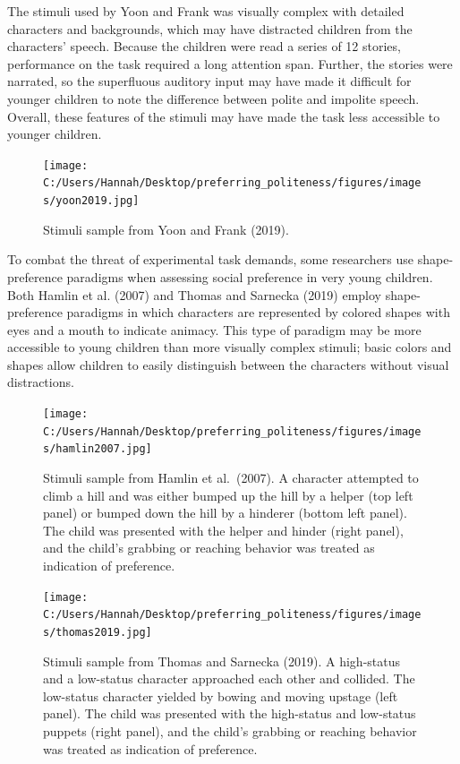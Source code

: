 \documentclass[
  english,
  man,floatsintext]{apa6}
\begin{document}
The stimuli used by Yoon and Frank was visually complex with detailed characters and backgrounds, which may have distracted children from the characters' speech. Because the children were read a series of 12 stories, performance on the task required a long attention span. Further, the stories were narrated, so the superfluous auditory input may have made it difficult for younger children to note the difference between polite and impolite speech. Overall, these features of the stimuli may have made the task less accessible to younger children.

\begin{figure}
\centering
\texttt{[image: C:/Users/Hannah/Desktop/preferring\_politeness/figures/images/yoon2019.jpg]}
\caption{Stimuli sample from Yoon and Frank (2019).}
\end{figure}

To combat the threat of experimental task demands, some researchers use shape-preference paradigms when assessing social preference in very young children. Both Hamlin et al. (2007) and Thomas and Sarnecka (2019) employ shape-preference paradigms in which characters are represented by colored shapes with eyes and a mouth to indicate animacy. This type of paradigm may be more accessible to young children than more visually complex stimuli; basic colors and shapes allow children to easily distinguish between the characters without visual distractions.

\newpage

\begin{figure}
\centering
\texttt{[image: C:/Users/Hannah/Desktop/preferring\_politeness/figures/images/hamlin2007.jpg]}
\caption{Stimuli sample from Hamlin et al.~(2007). A character attempted to climb a hill and was either bumped up the hill by a helper (top left panel) or bumped down the hill by a hinderer (bottom left panel). The child was presented with the helper and hinder (right panel), and the child's grabbing or reaching behavior was treated as indication of preference.}
\end{figure}

\newpage

\begin{figure}
\centering
\texttt{[image: C:/Users/Hannah/Desktop/preferring\_politeness/figures/images/thomas2019.jpg]}
\caption{Stimuli sample from Thomas and Sarnecka (2019). A high-status and a low-status character approached each other and collided. The low-status character yielded by bowing and moving upstage (left panel). The child was presented with the high-status and low-status puppets (right panel), and the child's grabbing or reaching behavior was treated as indication of preference.}
\end{figure}
\end{document}
